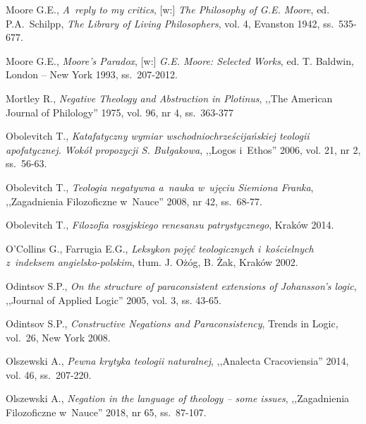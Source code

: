 \begin{thebibliography}{100}
Moore G.E., \textit{A~reply to my critics}, [w:] \textit{The Philosophy of G.E. Moore}, ed. P.A.~Schilpp,
\textit{The Library of Living Philosophers}, vol. 4, Evanston 1942, ss.~535-677.

Moore G.E., \textit{Moore's Paradox}, [w:] \textit{G.E. Moore: Selected Works}, ed. T. Baldwin, London -- New York 1993, ss.~207-2012.

Mortley R., \textit{Negative Theology and Abstraction in Plotinus}, ,,The American Journal of Philology'' 1975, vol. 96, nr 4, ss.~363-377



Obolevitch T., \textit{Katafatyczny wymiar wschodniochrześcijańskiej teologii apofatycznej. Wokół propozycji S. Bułgakowa}, ,,Logos i~Ethos'' 2006, vol. 21, nr 2, ss.~56-63.

Obolevitch T., \textit{Teologia negatywna a~nauka w~ujęciu Siemiona Franka}, ,,Zagadnienia Filozoficzne w~Nauce'' 2008, nr 42, ss.~68-77.

Obolevitch T., \textit{Filozofia rosyjskiego renesansu patrystycznego}, Kraków 2014.

O'Collins G., Farrugia E.G., \textit{Leksykon pojęć teologicznych i~kościelnych z~indeksem angielsko-polskim}, tłum. J. Ożóg, B. Żak, Kraków 2002.

Odintsov S.P., \textit{On the structure of paraconsistent extensions of Johansson's logic}, ,,Journal of Applied Logic'' 2005, vol. 3, ss. 43-65.

Odintsov S.P., \textit{Constructive Negations and Paraconsistency}, Trends in Logic, vol.~26, New York 2008.

Olszewski A., \textit{Pewna krytyka teologii naturalnej}, ,,Analecta Cracoviensia'' 2014, vol. 46, ss.~207-220.

Olszewski A., \textit{Negation in the language of theology -- some issues}, ,,Zagadnienia Filozoficzne w~Nauce'' 2018, nr 65, ss.~87-107.


\end{thebibliography}
